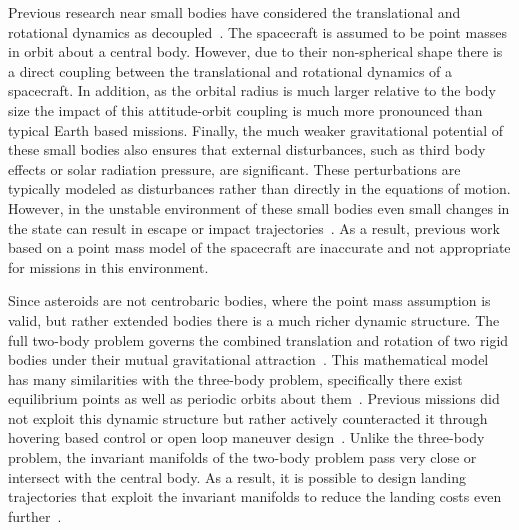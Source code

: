 \documentclass[11pt]{article} %
\begin{document}
Previous research near small bodies have considered the translational and rotational dynamics as decoupled~\cite{broschart2005,scheeres1994}.
The spacecraft is assumed to be point masses in orbit about a central body.
However, due to their non-spherical shape there is a direct coupling between the translational and rotational dynamics of a spacecraft.
In addition, as the orbital radius is much larger relative to the body size the impact of this attitude-orbit coupling is much more pronounced than typical Earth based missions. 
Finally, the much weaker gravitational potential of these small bodies also ensures that external disturbances, such as third body effects or solar radiation pressure, are significant.
These perturbations are typically modeled as disturbances rather than directly in the equations of motion. 
However, in the unstable environment of these small bodies even small changes in the state can result in escape or impact trajectories~\cite{scheeres2012}.
As a result, previous work based on a point mass model of the spacecraft are inaccurate and not appropriate for missions in this environment. 

Since asteroids are not centrobaric bodies, where the point mass assumption is valid, but rather extended bodies there is a much richer dynamic structure.
The full two-body problem governs the combined translation and rotation of two rigid bodies under their mutual gravitational attraction~\cite{fahnestock2006}. 
This mathematical model has many similarities with the three-body problem, specifically there exist equilibrium points as well as periodic orbits about them~\cite{scheeres1994,koon2000}.
Previous missions did not exploit this dynamic structure but rather actively counteracted it through hovering based control or open loop maneuver design~\cite{broschart2005,antreasian2002}.
Unlike the three-body problem, the invariant manifolds of the two-body problem pass very close or intersect with the central body. 
As a result, it is possible to design landing trajectories that exploit the invariant manifolds to reduce the landing costs even further~\cite{herrera2014}.  

\end{document}
